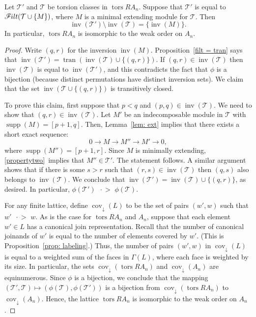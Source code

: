 \documentclass[ALCO,ThmDefs,Unicode,epreuves]{cedram}
\DeclareMathOperator{\tors}{tors}
\DeclareMathOperator{\supp}{supp}
\DeclareMathOperator{\cov}{cov}
\DeclareMathOperator{\inv}{inv}
\newcommand{\calT}{\mathcal{T}}
\newcommand{\filt}{\mathscr{F}\Mk ilt}
\newcommand{\covers}{{\,\,\,\cdot\!\!\!\! >\,\,}}
\newcommand{\covdown}{\cov_{\downarrow}}
\newcommand{\tran}{\operatorname{tran}}
\renewcommand{\1}{\hat{1}}
\newcommand{\0}{\hat{0}}
\newcommand*{\Mk}{\mkern -2mu}
\begin{document}
\begin{theorem}\label{inversion and cover}
Let $\calT'$ and $\calT$ be torsion classes in $\tors RA_n$.
Suppose that $\calT'$ is equal to $\filt(\calT \cup\{M\})$, where $M$ is a minimal extending module for $\calT$.
Then $${\inv(\calT') \setminus \inv(\calT)} = \{\inv(M)\}.$$
In particular, $\tors RA_n$ is isomorphic to the weak order on $A_n$.
\end{theorem}
\begin{proof}
Write $(q,r)$ for the inversion $\inv(M)$.
Proposition~\ref{filt = tran} says that $\inv(\calT') = \tran(\inv(\calT) \cup \{(q,r)\})$.
If $(q,r)\in \inv(\calT)$ then $\inv(\calT)$ is equal to $\inv(\calT')$, and this contradicts the fact that $\phi$ is a bijection (because distinct permutations have distinct inversion sets).
We claim that the set $\inv(\calT\cup \{(q,r)\})$ is transitively closed.

To prove this claim, first suppose that $p<q$ and $(p,q)\in \inv(\calT)$.
We need to show that $(q,r)\in \inv(\calT)$.
Let $M'$ be an indecomposable module in $\calT$ with $\supp(M)= [p+1,q]$.
Then, Lemma~\ref{lem: ext} implies that there exists a short exact sequence:
\[0\to M \to M'' \to M'\to 0,\]
where $\supp(M'')= [p+1,r]$.
Since $M$ is minimally extending, \ref{propertytwo}~implies that $M''\in \calT'$.
The statement follows.
A similar argument shows that if there is some $s>r$ such that $(r,s)\in \inv(\calT)$ then $(q,s)$ also belongs to $\inv(\calT)$.
We conclude that $\inv(\calT') = \inv(\calT)\cup \{(q,r)\}$, as desired.
In particular, $\phi(\calT')\covers \phi(\calT)$.

For any finite lattice, define $\covdown(L)$ to be the set of pairs $(w',w)$ such that $w'\covers w$.
As is the case for $\tors RA_n$ and $A_n$, suppose that each element $w'\in L$ has a canonical join representation.
Recall that the number of canonical joinands of $w'$ is equal to the number of elements covered by $w'$.
(This is Proposition~\ref{prop: labeling}.)
Thus, the number of pairs $(w',w)$ in $\covdown(L)$ is equal to a weighted sum of the faces in $\Gamma(L)$, where each face is weighted by its size.
In particular, the sets $\covdown(\tors RA_n)$ and $\covdown(A_n)$ are equinumerous.
Since $\phi$ is a bijection, we conclude that the mapping $(\calT', \calT) \mapsto (\phi(\calT),\phi(\calT'))$ is a bijection from $\covdown(\tors RA_n)$ to $\covdown(A_n)$.
Hence, the lattice $\tors RA_n$ is isomorphic to the weak order on $A_n$.
\end{proof}



 




\end{document}
